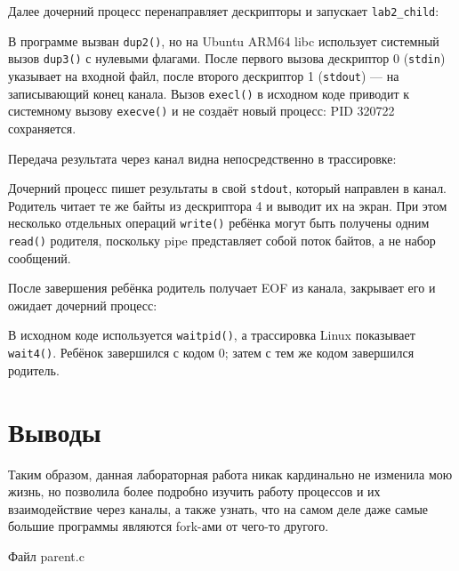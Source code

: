 \documentclass[12pt, a4paper]{article}
\begin{document}
Далее дочерний процесс перенаправляет дескрипторы и запускает
\texttt{lab2\_child}:


В программе вызван \texttt{dup2()}, но на Ubuntu ARM64 libc использует системный
вызов \texttt{dup3()} с нулевыми флагами. После первого вызова дескриптор 0
(\texttt{stdin}) указывает на входной файл, после второго дескриптор 1
(\texttt{stdout}) --- на записывающий конец канала. Вызов \texttt{execl()} в
исходном коде приводит к системному вызову \texttt{execve()} и не создаёт новый
процесс: PID 320722 сохраняется.

Передача результата через канал видна непосредственно в трассировке:


Дочерний процесс пишет результаты в свой \texttt{stdout}, который направлен в
канал. Родитель читает те же байты из дескриптора 4 и выводит их на экран. При этом
несколько отдельных операций \texttt{write()} ребёнка могут быть получены одним
\texttt{read()} родителя, поскольку pipe представляет собой поток байтов, а не
набор сообщений.

После завершения ребёнка родитель получает EOF из канала, закрывает его и ожидает
дочерний процесс:


В исходном коде используется \texttt{waitpid()}, а трассировка Linux показывает
\texttt{wait4()}. Ребёнок завершился с кодом 0; затем с тем же кодом завершился
родитель.

\section{Выводы}

Таким образом, данная лабораторная работа никак кардинально не
изменила мою жизнь, но позволила более подробно изучить работу процессов и
их взаимодействие через каналы, а также узнать, что на самом деле даже самые
большие программы являются fork-ами от чего-то другого.


\begin{listingblock}{Файл parent.c}
\end{listingblock}
\end{document}
